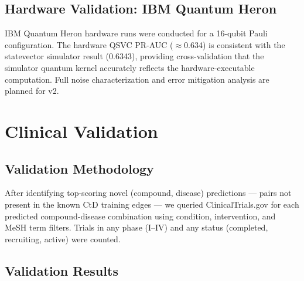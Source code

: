 \documentclass[twocolumn,10pt]{article}
\begin{document}
\FloatBarrier
\subsection{Hardware Validation: IBM Quantum Heron}

IBM Quantum Heron hardware runs were conducted for a 16-qubit Pauli configuration. The hardware QSVC PR-AUC (${\approx}$0.634) is consistent with the statevector simulator result (0.6343), providing cross-validation that the simulator quantum kernel accurately reflects the hardware-executable computation. Full noise characterization and error mitigation analysis are planned for v2.

\FloatBarrier
\section{Clinical Validation}

\subsection{Validation Methodology}

After identifying top-scoring novel (compound, disease) predictions --- pairs not present in the known CtD training edges --- we queried ClinicalTrials.gov for each predicted compound-disease combination using condition, intervention, and MeSH term filters. Trials in any phase (I--IV) and any status (completed, recruiting, active) were counted.

\subsection{Validation Results}
\end{document}
